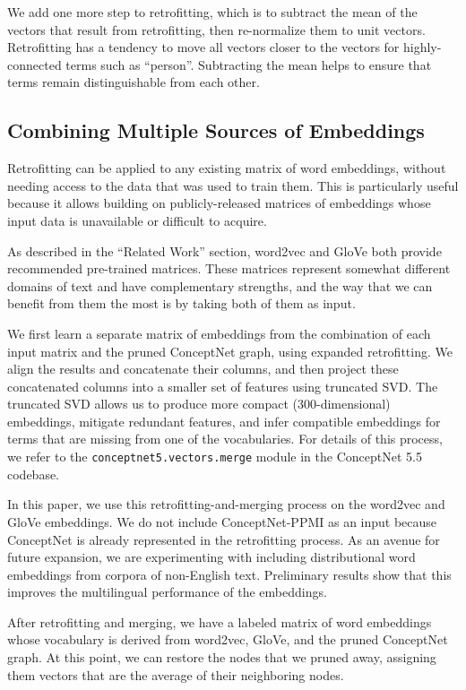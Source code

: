 \documentclass[letterpaper]{article}
\begin{document}
We add one more step to retrofitting, which is to subtract the mean of the
vectors that result from retrofitting, then re-normalize them to unit vectors.
Retrofitting has a tendency to move all vectors closer to the vectors for
highly-connected terms such as ``person''. Subtracting the mean helps to ensure
that terms remain distinguishable from each other.

\subsection{Combining Multiple Sources of Embeddings}

Retrofitting can be applied to any existing matrix of word embeddings, without
needing access to the data that was used to train them. This is particularly
useful because it allows building on publicly-released matrices of embeddings
whose input data is unavailable or difficult to acquire.

As described in the ``Related Work'' section, word2vec and GloVe both provide
recommended pre-trained matrices. These matrices represent somewhat different
domains of text and have complementary strengths, and the way that we can
benefit from them the most is by taking both of them as input.

We first learn a separate matrix of embeddings from the combination of each
input matrix and the pruned ConceptNet graph, using expanded retrofitting. We
align the results and concatenate their columns, and then project these
concatenated columns into a smaller set of features using truncated SVD. The
truncated SVD allows us to produce more compact (300-dimensional) embeddings,
mitigate redundant features, and infer compatible embeddings for terms that
are missing from one of the vocabularies. For details of this process, we
refer to the \texttt{conceptnet5.vectors.merge} module in the ConceptNet 5.5
codebase.

In this paper, we use this retrofitting-and-merging process on the
word2vec and GloVe embeddings. We do not include ConceptNet-PPMI as an input
because ConceptNet is already represented in the retrofitting process. As an
avenue for future expansion, we are experimenting with including distributional
word embeddings from corpora of non-English text. Preliminary results show that
this improves the multilingual performance of the embeddings.

After retrofitting and merging, we have a labeled matrix of word embeddings whose
vocabulary is derived from word2vec, GloVe, and the pruned ConceptNet graph. At
this point, we can restore the nodes that we pruned away, assigning them vectors
that are the average of their neighboring nodes.
\end{document}

